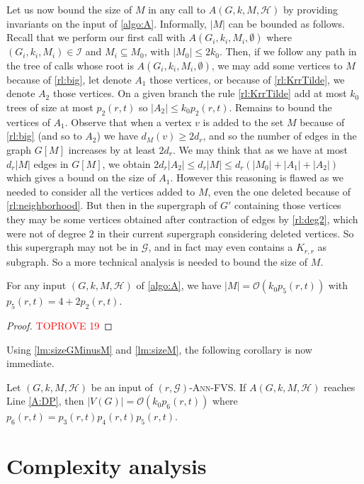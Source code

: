 \documentclass{amsart}
\newcommand{\G}{\mathcal{G}}
\newcommand{\I}{\mathcal{I}}
\newcommand{\mH}{\mathcal{H}}
\newcommand{\AFVS}{\textsc{$(r,\G)$-Ann-FVS}\xspace}
\newcommand{\ruleref}[1]{\hyperref[#1]{\ref*{#1}}}
\renewcommand{\O}{\mathcal{O}}
\begin{document}
Let us now bound the size of $M$ in any call to $A(G,k,M,\mH)$ by providing invariants on the input of \autoref{algo:A}.
Informally, $|M|$ can be bounded as follows.
Recall that we perform our first call with $A(G_i,k_i,M_i,\emptyset)$ where $(G_i,k_i,M_i) \in \I$ and $M_i \subseteq M_0$, with $|M_0| \le 2k_0$.
Then, if we follow any path in the tree of calls whose root is $A(G_i,k_i,M_i,\emptyset)$, we may add some vertices to $M$ because of \ruleref{rl:big}, let denote $A_1$ those vertices, or because of \ruleref{rl:KrrTilde}, we denote $A_2$ those vertices. On a given branch the rule \ruleref{rl:KrrTilde} add at most $k_0$ trees of size at most $p_2(r,t)$ so $|A_2|\leq k_0p_2(r,t)$. Remains to bound the vertices of $A_1$. Observe that when a vertex $v$ is added to the set $M$ because of \ruleref{rl:big} (and so to $A_2$) we have $d_M(v)\geq 2d_r$, and so the number of edges in the graph $G[M]$ increases by at least $2d_r$. We may think that as we have at most $d_r|M|$ edges in $G[M]$, we obtain $2d_r|A_2|\leq d_r|M| \leq d_r(|M_0|+|A_1|+|A_2|)$ which gives a bound on the size of $A_1$. However this reasoning is flawed as we needed to consider all the vertices added to $M$, even the one deleted because of \ruleref{rl:neighborhood}. But then in the supergraph of $G'$ containing those vertices they may be some vertices obtained after contraction of edges by \ruleref{rl:deg2}, which were not of degree $2$ in their current supergraph considering deleted vertices. So this supergraph may not be in $\G$, and in fact may even contains a $K_{r,r}$ as subgraph. So a more technical analysis is needed to bound the size of $M$.

\begin{lemma}\label{lm:sizeM}
For any input $(G,k,M,\mH)$ of \autoref{algo:A}, we have $|M|=\O(k_0p_5(r,t))$ with $p_5(r,t)=4+2p_2(r,t)$.
\end{lemma}
\begin{proof}\textcolor{red}{TOPROVE 19}\end{proof}

Using \autoref{lm:sizeGMinusM} and \autoref{lm:sizeM}, the following corollary is now immediate.

\begin{corollary}\label{lm:sizeG-end}
Let $(G,k,M,\mH)$ be an input of \AFVS.
If $A(G,k,M,\mH)$ reaches Line \ref{A:DP},
then $|V(G)|=\O(k_0p_6(r,t))$ where $p_6(r,t)=p_3(r,t)p_4(r,t)p_5(r,t)$.
\end{corollary}

\section{Complexity analysis}\label{sec:analysis}
\end{document}
